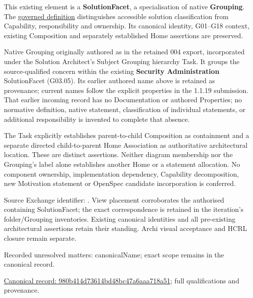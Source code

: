 This existing element is a \textbf{SolutionFacet}, a specialisation of native
\textbf{Grouping}. The \href{\detokenize{../../../../../../../governance/continuum-representation.md#solutionfacet-classification--1119-candidate}}{governed definition}
distinguishes accessible solution classification from Capability, responsibility
and ownership. Its canonical identity, G01–G18 context, existing Composition
and separately established Home assertions are preserved.



Native Grouping originally authored as \texttt{} in the retained 004 export,
incorporated under the Solution Architect's Subject Grouping hierarchy Task.
It groups the source-qualified \texttt{} concern within
the existing \textbf{Security Administration} SolutionFacet (G03.05). Its earlier authored name above is retained as provenance; current names
follow the explicit properties in the 1.1.19 submission.
That earlier incoming record has no Documentation or authored Properties; no normative
definition, native statement, classification of individual statements, or
additional responsibility is invented to complete that absence.



The Task explicitly establishes parent-to-child Composition as containment and
a separate directed child-to-parent Home Association as authoritative architectural
location. These are distinct assertions. Neither diagram membership nor the
Grouping's label alone establishes another Home or a statement allocation.
No component ownership, implementation dependency, Capability decomposition,
new Motivation statement or OpenSpec candidate incorporation is conferred.



Source Exchange identifier: \texttt{}. View placement corroborates
the authorised containing SolutionFacet; the exact correspondence is retained in the
iteration's folder/Grouping inventories. Existing canonical identities and all
pre-existing architectural assertions retain their standing. Archi visual
acceptance and HCRL closure remain separate.


{\small Recorded unresolved matters: canonicalName; exact scope remains in the canonical record.}\par
{\footnotesize \href{../../../../../../../continuum/grouping/980b414d73614bd48bc47a6aaa718a51.md}{Canonical record: 980b414d73614bd48bc47a6aaa718a51}; full qualifications and provenance.}\par
